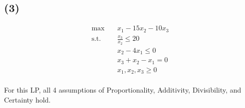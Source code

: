 \documentclass[12pt]{article}
\begin{document}
\subsection*{(3)}


\begin{align*}
    \max \quad & x_{1} - 15x_{2} - 10 x_{3} \\ 
    \text{s.t.} \quad & \frac{x_{3}}{x_{2}} \leq 20 \\ 
    & x_{2} - 4 x_{1} \leq 0 \\ 
    & x_{3} + x_{2} - x_{1} = 0 \\ 
    & x_{1}, x_{2}, x_{3} \geq 0 \\ 
\end{align*}

\noindent For this LP, all 4 assumptions of Proportionality, Additivity, Divisibility, and Certainty hold. 
\end{document}

